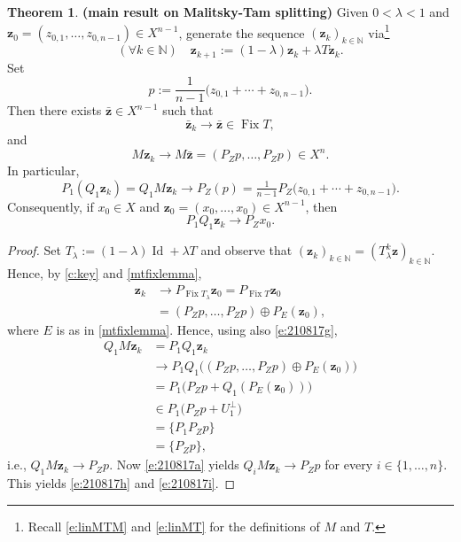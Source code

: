 \documentclass[11pt]{article}
\newcommand{\bz}{\ensuremath{\mathbf{z}}}
\newcommand{\kkk}{\ensuremath{{k\in{\mathbb N}}}}
\newcommand{\Fix}{\ensuremath{\operatorname{Fix}}}
\newcommand{\Id}{\ensuremath{\operatorname{Id}}}
\theoremstyle{definition}
\newtheorem{theorem}{Theorem}[section]
\providecommand{\Id}{\operatorname{{ Id}}}
\providecommand{\Id}{\operatorname{Id}}
\begin{document}
{\begin{theorem} {\bf (main result on Malitsky-Tam splitting)} 
Given $0<\lambda<1$ and $\bz_0=(z_{0,1},\ldots,z_{0,n-1}) \in X^{n-1}$, 
generate the sequence $(\bz_k)_\kkk$ via\footnote{Recall \cref{e:linMTM} 
and \cref{e:linMT} for the definitions of $M$ and $T$.}
\begin{equation*}
(\forall\kkk)\quad
\bz_{k+1} := (1-\lambda)\bz_k + \lambda T\bz_k.
\end{equation*}
Set 
\begin{equation*}
p := \frac{1}{n-1}\big(z_{0,1}+\cdots+z_{0,n-1}\big). 
\end{equation*}
Then there exists $\bar{\bz}\in X^{n-1}$ such that 
\begin{equation*}
\bar{\bz}_k \to \bar{\bz} \in \Fix T,
\end{equation*}
and 
\begin{equation}
\label{e:210817h}
M\bz_k \to M\bar{\bz} = (P_Zp,\ldots,P_Zp) \in X^n. 
\end{equation}
In particular, 
\begin{equation}
\label{e:210817i}
P_1(Q_1\bz_k)= Q_1M\bz_k \to P_Z(p) = \tfrac{1}{n-1}P_Z\big(z_{0,1}+\cdots+z_{0,n-1}\big).
\end{equation}
Consequently, if $x_0\in X$ and 
$\bz_0 = (x_0,\ldots,x_0)\in X^{n-1}$,
then 
\begin{equation}
\label{e:yayyay}
P_1Q_1\bz_k \to P_Zx_0.
\end{equation}
\end{theorem}
\begin{proof}
Set $T_\lambda := (1-\lambda)\Id+\lambda T$ and observe that 
$(\bz_k)_\kkk = (T_\lambda^k\bz)_\kkk$. 
Hence, by \cref{c:key} and \cref{mtfixlemma},
\begin{align*}
\bz_k&\to P_{\Fix T_\lambda}\bz_0=P_{\Fix T}\bz_0\\
&=(P_Zp,\ldots,P_Zp)\oplus P_E(\bz_0), 
\end{align*}
where $E$ is as in \cref{mtfixlemma}. 
Hence, using also \cref{e:210817g}, 
\begin{align*}
Q_1M\bz_k &= P_1Q_1\bz_k \\
&\to P_1Q_1\big((P_Zp,\ldots,P_Zp)\oplus P_E(\bz_0)\big)\\
&=P_1\big(P_Zp+Q_1(P_E(\bz_0))\big)\\
&\in P_1\big(P_Zp+U_1^\perp\big)\\
&=\{P_1P_Zp\}\\
&=\{P_Zp\},
\end{align*}
i.e., $Q_1M\bz_k\to P_Zp$. 
Now \cref{e:210817a} yields 
$Q_iM\bz_k\to P_Zp$ for every $i\in\{1,\ldots,n\}$.
This yields \cref{e:210817h} and \cref{e:210817i}.


\end{proof}}
\end{document}
